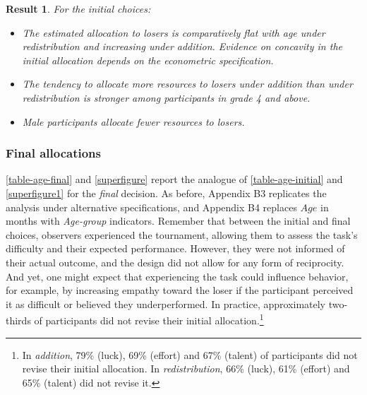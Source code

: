\documentclass[11pt]{article}
\newtheorem{Result}{Result}
\begin{document}
\begin{Result} \label{res-initial} For the initial choices: 
\noindent \begin{itemize}[noitemsep, topsep=0pt, parsep=0pt, partopsep=0pt]
\item[\textbf{a)}] The estimated allocation to losers is comparatively flat with age under redistribution and increasing under addition. Evidence on concavity in the initial allocation depends on the econometric specification.
\item[\textbf{b)}] The tendency to allocate more resources to losers under addition than under redistribution is stronger among participants in grade 4 and above.
\item[\textbf{c)}] Male participants allocate fewer resources to losers.

\end{itemize}
\end{Result}

\subsubsection{Final allocations}


\autoref{table-age-final} and \autoref{superfigure} report the analogue of \autoref{table-age-initial} and \autoref{superfigure1} for the \emph{final} decision. As before, Appendix B3 replicates the analysis under alternative specifications, and Appendix B4 replaces $Age$ in months with \emph{Age-group} indicators. Remember that between the initial and final choices, observers experienced the tournament, allowing them to assess the task's difficulty and their expected performance. However, they were not informed of their actual outcome, and the design did not allow for any form of reciprocity. And yet, one might expect that experiencing the task could influence behavior, for example, by increasing empathy toward the loser if the participant perceived it as difficult or believed they underperformed. In practice, approximately two-thirds of participants did not revise their initial allocation.\footnote{\label{foot-equal}In \emph{addition}, 79\% (luck), 69\% (effort) and 67\% (talent) of participants did not revise their initial allocation. In \emph{redistribution}, 66\% (luck), 61\% (effort) and 65\% (talent) did not revise it.}




\end{document}

